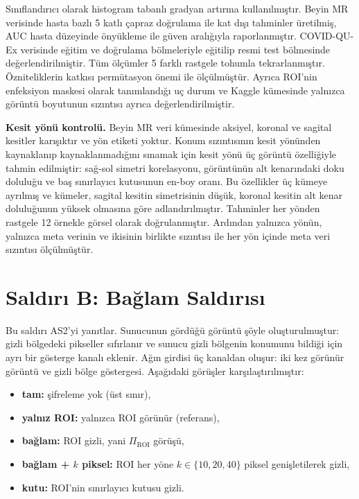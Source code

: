 Sınıflandırıcı olarak histogram tabanlı gradyan artırma kullanılmıştır. Beyin MR verisinde hasta bazlı 5 katlı çapraz doğrulama ile kat dışı tahminler üretilmiş, AUC hasta düzeyinde önyükleme ile güven aralığıyla raporlanmıştır. COVID-QU-Ex verisinde eğitim ve doğrulama bölmeleriyle eğitilip resmi test bölmesinde değerlendirilmiştir. Tüm ölçümler 5 farklı rastgele tohumla tekrarlanmıştır. Özniteliklerin katkısı permütasyon önemi ile ölçülmüştür. Ayrıca ROI'nin enfeksiyon maskesi olarak tanımlandığı uç durum ve Kaggle kümesinde yalnızca görüntü boyutunun sızıntısı ayrıca değerlendirilmiştir.

\textbf{Kesit yönü kontrolü.} Beyin MR veri kümesinde aksiyel, koronal ve sagital kesitler karışıktır ve yön etiketi yoktur. Konum sızıntısının kesit yönünden kaynaklanıp kaynaklanmadığını sınamak için kesit yönü üç görüntü özelliğiyle tahmin edilmiştir: sağ-sol simetri korelasyonu, görüntünün alt kenarındaki doku doluluğu ve baş sınırlayıcı kutusunun en-boy oranı. Bu özellikler üç kümeye ayrılmış ve kümeler, sagital kesitin simetrisinin düşük, koronal kesitin alt kenar doluluğunun yüksek olmasına göre adlandırılmıştır. Tahminler her yönden rastgele 12 örnekle görsel olarak doğrulanmıştır. Ardından yalnızca yönün, yalnızca meta verinin ve ikisinin birlikte sızıntısı ile her yön içinde meta veri sızıntısı ölçülmüştür.

\section{Saldırı B: Bağlam Saldırısı}\label{sec:attackB}

Bu saldırı AS2'yi yanıtlar. Sunucunun gördüğü görüntü şöyle oluşturulmuştur: gizli bölgedeki pikseller sıfırlanır ve sunucu gizli bölgenin konumunu bildiği için ayrı bir gösterge kanalı eklenir. Ağın girdisi üç kanaldan oluşur: iki kez görünür görüntü ve gizli bölge göstergesi. Aşağıdaki görüşler karşılaştırılmıştır:

\begin{itemize}
\item \textbf{tam:} şifreleme yok (üst sınır),
\item \textbf{yalnız ROI:} yalnızca ROI görünür (referans),
\item \textbf{bağlam:} ROI gizli, yani $\Pi_{\mathrm{ROI}}$ görüşü,
\item \textbf{bağlam + $k$ piksel:} ROI her yöne $k \in \{10, 20, 40\}$ piksel genişletilerek gizli,
\item \textbf{kutu:} ROI'nin sınırlayıcı kutusu gizli.
\end{itemize}

